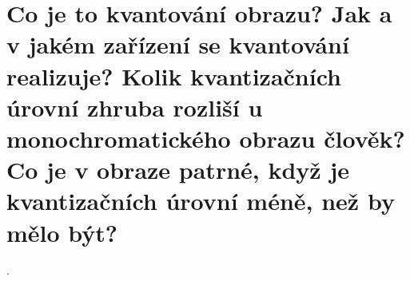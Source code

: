 \section{Co je to kvantování obrazu? Jak a v jakém zařízení se kvantování realizuje? Kolik kvantizačních úrovní zhruba 
rozliší u monochromatického obrazu člověk? Co je v obraze patrné, když je kvantizačních úrovní méně, než by mělo být?}.